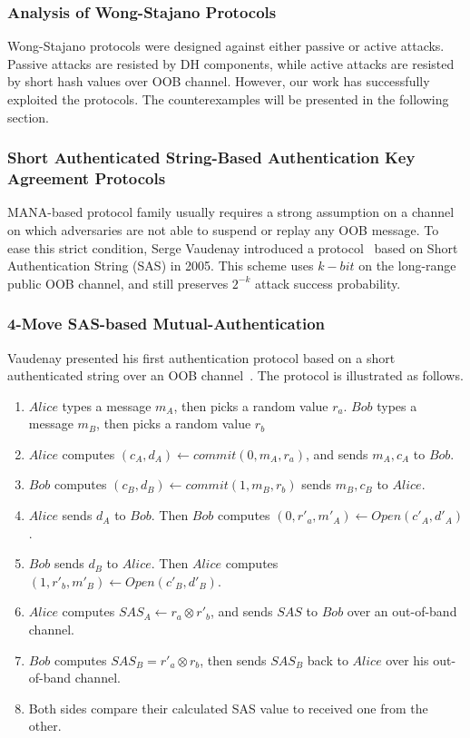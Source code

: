 \subsubsection*{Analysis of Wong-Stajano Protocols}

Wong-Stajano protocols were designed against either passive or active attacks. Passive attacks are resisted by DH components, while active attacks are resisted by short hash values over OOB channel. However, our work has successfully exploited the protocols. The counterexamples will be presented in the following section. 

\subsubsection{Short Authenticated String-Based Authentication Key Agreement Protocols}

MANA-based protocol family usually requires a strong assumption on a channel on which adversaries are not able to suspend or replay any OOB message. To ease this strict condition, Serge Vaudenay introduced a protocol~\cite{Vaudenay:2005qa} based on Short Authentication String (SAS) in 2005. This scheme uses $k-bit$ on the long-range public OOB channel, and still preserves $2^{-k}$ attack success probability.

\subsubsection*{4-Move SAS-based Mutual-Authentication}

Vaudenay presented his first authentication protocol based on a short authenticated string over an OOB channel~\cite{Vaudenay:2005qa}. The protocol is illustrated as follows.

\begin{enumerate}
\item $Alice$ types a message $m_A$, then picks a random value $r_a$. $Bob$ types a message $m_B$, then picks a random value $r_b$
\item $Alice$ computes $(c_A,d_A) \leftarrow commit(0,m_A,r_a)$, and sends $m_A, c_A$ to $Bob$.
\item $Bob$ computes $(c_B,d_B) \leftarrow commit(1,m_B,r_b)$ sends $m_B, c_B$ to $Alice$.
\item $Alice$ sends $d_A$ to $Bob$. Then $Bob$ computes $(0,r'_a,m'_A) \leftarrow Open(c'_A,d'_A)$. 
\item $Bob$ sends $d_B$ to $Alice$. Then $Alice$ computes $(1,r'_b,m'_B) \leftarrow Open(c'_B,d'_B)$. 
\item $Alice$ computes $SAS_A \leftarrow r_a \otimes r'_b$, and sends $SAS$ to $Bob$ over an out-of-band channel. 
\item $Bob$ computes $SAS_B = r'_a \otimes r_b$, then sends $SAS_B$ back to $Alice$ over his out-of-band channel. 
\item Both sides compare their calculated SAS value to received one from the other. 
\end{enumerate}

